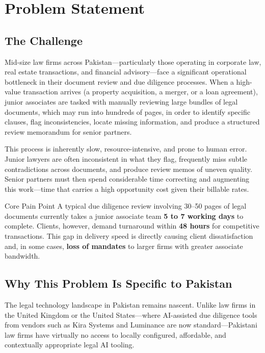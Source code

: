 \documentclass[12pt, a4paper]{article}
\begin{document}
\tableofcontents
\newpage

\section{Problem Statement}

\subsection{The Challenge}

Mid-size law firms across Pakistan---particularly those operating in corporate law,
real estate transactions, and financial advisory---face a significant operational
bottleneck in their document review and due diligence processes. When a high-value
transaction arrives (a property acquisition, a merger, or a loan agreement), junior
associates are tasked with manually reviewing large bundles of legal documents,
which may run into hundreds of pages, in order to identify specific clauses, flag
inconsistencies, locate missing information, and produce a structured review
memorandum for senior partners.

This process is inherently slow, resource-intensive, and prone to human error.
Junior lawyers are often inconsistent in what they flag, frequently miss subtle
contradictions across documents, and produce review memos of uneven quality.
Senior partners must then spend considerable time correcting and augmenting this
work---time that carries a high opportunity cost given their billable rates.

\begin{calloutbox}{Core Pain Point}
A typical due diligence review involving 30--50 pages of legal documents currently
takes a junior associate team \textbf{5 to 7 working days} to complete. Clients,
however, demand turnaround within \textbf{48 hours} for competitive transactions.
This gap in delivery speed is directly causing client dissatisfaction and, in some
cases, \textbf{loss of mandates} to larger firms with greater associate bandwidth.
\end{calloutbox}

\subsection{Why This Problem Is Specific to Pakistan}

The legal technology landscape in Pakistan remains nascent. Unlike law firms in the
United Kingdom or the United States---where AI-assisted due diligence tools from
vendors such as Kira Systems and Luminance are now standard---Pakistani law firms
have virtually no access to locally configured, affordable, and contextually
appropriate legal AI tooling.
\end{document}
